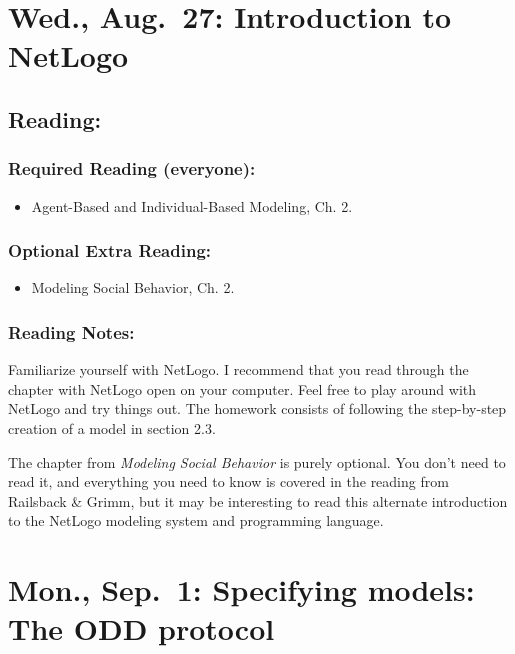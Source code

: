 \documentclass[
]{article}
\providecommand{\tightlist}{%
  \setlength{\itemsep}{0pt}\setlength{\parskip}{0pt}}
\begin{document}
\section{Wed., Aug.~27: Introduction to
NetLogo}\label{wed.-aug.-27-introduction-to-netlogo}

\subsection{Reading:}\label{reading-2}

\subsubsection{Required Reading
(everyone):}\label{required-reading-everyone-1}

\begin{itemize}
\tightlist
\item
  Agent-Based and Individual-Based Modeling, Ch. 2.
\end{itemize}

\subsubsection{Optional Extra Reading:}\label{optional-extra-reading-1}

\begin{itemize}
\tightlist
\item
  Modeling Social Behavior, Ch. 2.
\end{itemize}

\subsubsection{Reading Notes:}\label{reading-notes-1}

Familiarize yourself with NetLogo. I recommend that you read through the
chapter with NetLogo open on your computer. Feel free to play around
with NetLogo and try things out. The homework consists of following the
step-by-step creation of a model in section 2.3.

The chapter from \emph{Modeling Social Behavior} is purely optional. You
don't need to read it, and everything you need to know is covered in the
reading from Railsback \& Grimm, but it may be interesting to read this
alternate introduction to the NetLogo modeling system and programming
language.

\section{Mon., Sep.~1: Specifying models: The ODD
protocol}\label{mon.-sep.-1-specifying-models-the-odd-protocol}
\end{document}

